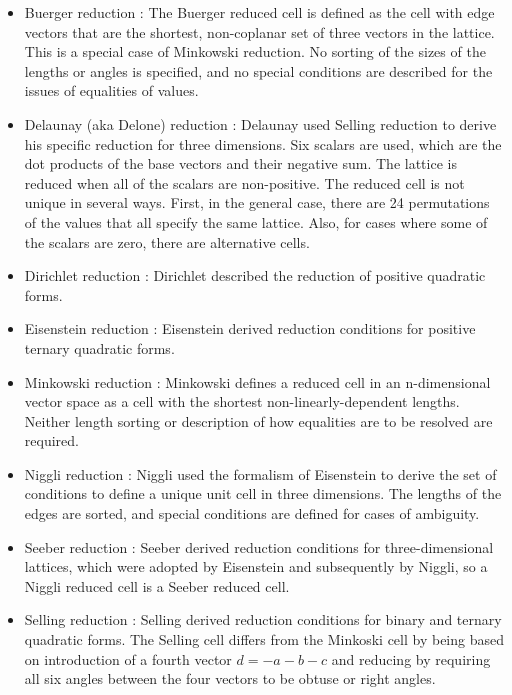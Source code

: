 \documentclass[preprint]{iucr}              %
\numberwithin{equation}{section}
\begin{document}
	\begin{itemize}

\item{Buerger reduction	\cite{Buerger1960}:
The Buerger reduced cell is defined as the cell with edge vectors that are the shortest, non-coplanar set of three vectors in the lattice. 
	This is a special case of Minkowski reduction. No sorting of the sizes
	of the lengths or angles is specified, and no special conditions are
	described for the issues of equalities of values.}
	
\item{Delaunay (aka Delone) reduction \cite{Delaunay1932}:
	Delaunay used Selling reduction to derive his specific
	reduction for three dimensions. Six scalars are used, which are the dot
	products of the base vectors and their negative sum. The lattice is
	reduced when all of the scalars are non-positive. The reduced cell is
	not unique in several ways. First, in the general case, there are 24
	permutations of the values that all specify the same lattice. Also,
	for cases where some of the scalars are zero, there are alternative
	cells.}
	
\item{Dirichlet reduction \cite{Dirichlet1850}:
	Dirichlet described the reduction of positive quadratic forms.}
	
\item{Eisenstein reduction	\cite{eisenstein1851}:
	Eisenstein derived reduction conditions for
	positive ternary quadratic forms.}
	
\item{Minkowski reduction \cite{Minkowski1905}:
	Minkowski defines a reduced cell in an n-dimensional vector
	space as a cell with the shortest non-linearly-dependent lengths.
	Neither length sorting or description of how equalities are to be resolved are required.}
	
\item{Niggli reduction \cite{Niggli1928}:  Niggli used the formalism of Eisenstein to derive the
	set of conditions to define a unique unit cell in three dimensions.
	The lengths of the edges are sorted, and special conditions
	are defined for cases of ambiguity.}
	
\item{Seeber reduction \cite{Seeber1831}:
Seeber derived reduction conditions for three-dimensional lattices,
which were adopted by Eisenstein and subsequently by Niggli, so a Niggli reduced cell is a Seeber reduced cell.}
	
\item{Selling reduction \cite{Selling1874}: Selling derived reduction conditions for binary and ternary quadratic forms.
The Selling cell differs from the Minkoski cell by being based
on introduction of a fourth vector $d = -a-b-c$ and reducing by
requiring all six angles between the four vectors to be obtuse
or right angles.
}
	

\end{itemize}
\end{document}
